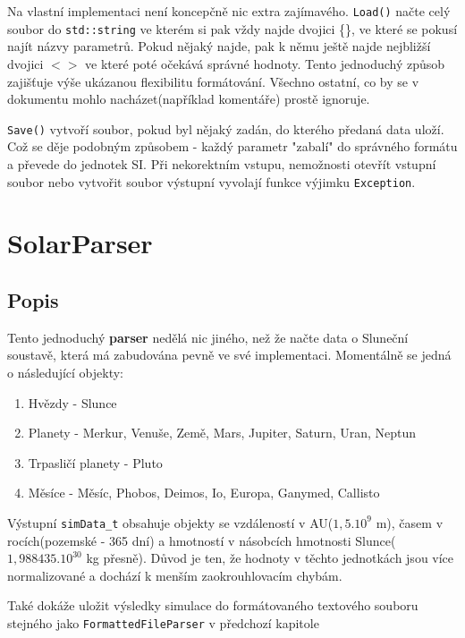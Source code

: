 Na vlastní implementaci není koncepčně nic extra zajímavého. \texttt{Load()} načte celý soubor do \texttt{std::string} ve kterém si pak vždy najde dvojici \{\}, ve které se pokusí najít názvy parametrů. Pokud nějaký najde, pak k němu ještě najde nejbližší dvojici $ <> $  ve které poté očekává správné hodnoty. Tento jednoduchý způsob zajišťuje výše ukázanou flexibilitu formátování. Všechno ostatní, co by se v dokumentu mohlo nacházet(například komentáře) prostě ignoruje. 

\texttt{Save()} vytvoří soubor, pokud byl nějaký zadán, do kterého předaná data uloží. Což se děje podobným způsobem - každý parametr "zabalí" do správného formátu a převede do jednotek SI.
Při nekorektním vstupu, nemožnosti otevřít vstupní soubor nebo vytvořit soubor výstupní vyvolají funkce výjimku \texttt{Exception}.


\chapter{SolarParser}
\section{Popis}
Tento jednoduchý \textbf{parser} nedělá nic jiného, než že načte data o Sluneční soustavě, která má zabudována pevně ve své implementaci.
Momentálně se jedná o následující objekty:
\begin{enumerate}
	\item Hvězdy - Slunce
	\item Planety - Merkur, Venuše, Země, Mars, Jupiter, Saturn, Uran, Neptun
	\item Trpasličí planety - Pluto
	\item Měsíce - Měsíc, Phobos, Deimos, Io, Europa, Ganymed, Callisto
\end{enumerate}
Výstupní \texttt{simData\_t} obsahuje objekty se vzdáleností v AU($ 1,5.10^9 $ m), časem v rocích(pozemské - 365 dní) a hmotností v násobcích hmotnosti Slunce($ 1,988435.10^{30} $ kg přesně). Důvod je ten, že hodnoty v těchto jednotkách jsou více normalizované a dochází k menším zaokrouhlovacím chybám.

Také dokáže uložit výsledky simulace do formátovaného textového souboru stejného jako \texttt{FormattedFileParser} v předchozí kapitole